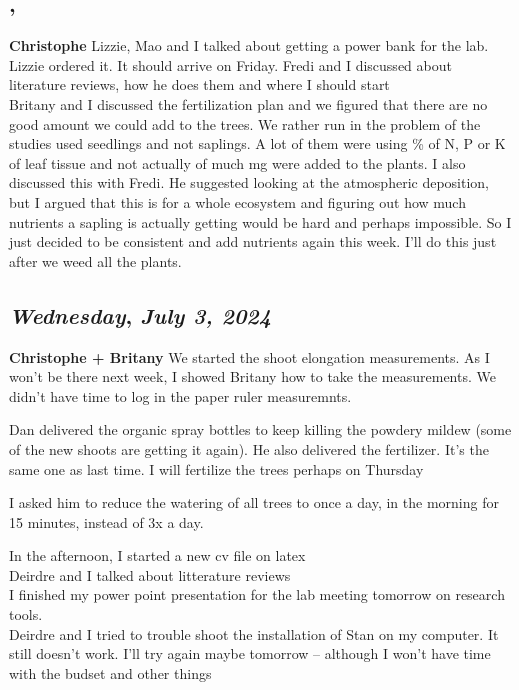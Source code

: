 \subsection*{\weekday, \day}
\textbf {Christophe}
Lizzie, Mao and I talked about getting a power bank for the lab. Lizzie ordered it. It should arrive on Friday.
Fredi and I discussed about literature reviews, how he does them and where I should start\\
Britany and I discussed the fertilization plan and we figured that there are no good amount we could add to the trees. We rather run in the problem of the studies used seedlings and not saplings. A lot of them were using \% of N, P or K of leaf tissue and not actually of much mg were added to the plants. I also discussed this with Fredi. He suggested looking at the atmospheric deposition, but I argued that this is for a whole ecosystem and figuring out how much nutrients a sapling is actually getting would be hard and perhaps impossible. So I just decided to be consistent and add nutrients again this week. I'll do this just after we weed all the plants.  

\def\day{\textit{July 3, 2024}}
\def\weekday{\textit{Wednesday}}
\subsection*{\weekday, \day}
\textbf {Christophe + Britany}
We started the shoot elongation measurements. As I won't be there next week, I showed Britany how to take the measurements. We didn't have time to log in the paper ruler measuremnts.
\par Dan delivered the organic spray bottles to keep killing the powdery mildew (some of the new shoots are getting it again). He also delivered the fertilizer. It's the same one as last time. I will fertilize the trees perhaps on Thursday
\par I asked him to reduce the watering of all trees to once a day, in the morning for 15 minutes, instead of 3x a day.
\par In the afternoon, I started a new cv file on latex\\
Deirdre and I talked about litterature reviews\\ 
I finished my power point presentation for the lab meeting tomorrow on research tools.\\
Deirdre and I tried to trouble shoot the installation of Stan on my computer. It still doesn't work. I'll try again maybe tomorrow -- although I won't have time with the budset and other things 

